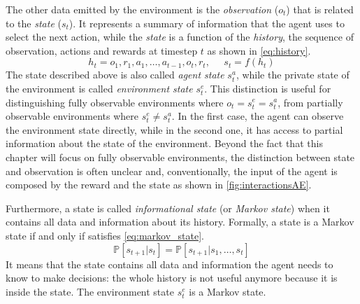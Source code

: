 The other data emitted by the environment is the \textit{observation} ($o_t$) that is related to the \textit{state} ($s_t$). It represents a summary of information that the agent uses to select the next action, while the \textit{state} is a function of the \textit{history}, the sequence of observation, actions and rewards at timestep $t$ as shown in \vref{eq:history}.
\begin{equation}\label{eq:history}
	h_t = o_1, r_1, a_1, \dots, a_{t-1}, o_{t}, r_t, \;\;\;\;\; s_t = f(h_t)
\end{equation}
The state described above is also called \textit{agent state} $s_t^a$, while the private state of the environment is called \textit{environment state} $s_t^e$. This distinction is useful for distinguishing fully observable environments where $o_t = s_t^e = s_t^a$, from partially observable environments where $s_t^e \neq s_t^a$.
In the first case, the agent can observe the environment state directly, while in the second one, it has access to partial information about the state of the environment.
Beyond the fact that this chapter will focus on fully observable environments, the distinction between state and observation is often unclear and, conventionally, the input of the agent is composed by the reward and the state as shown in \vref{fig:interactionsAE}.

Furthermore, a state is called \textit{informational state} (or \textit{Markov state}) when it contains all data and information about its history. Formally, a state is a Markov state if and only if satisfies \vref{eq:markov_state}.
\begin{equation} \label{eq:markov_state}
	\mathbb{P}[s_{t+1}| s_t] = \mathbb{P}[s_{t+1} | s_1, \dots, s_t]
\end{equation}
It means that the state contains all data and information the agent needs to know to make decisions: the whole history is not useful anymore because it is inside the state. The environment state $s_t^e$ is a Markov state.

